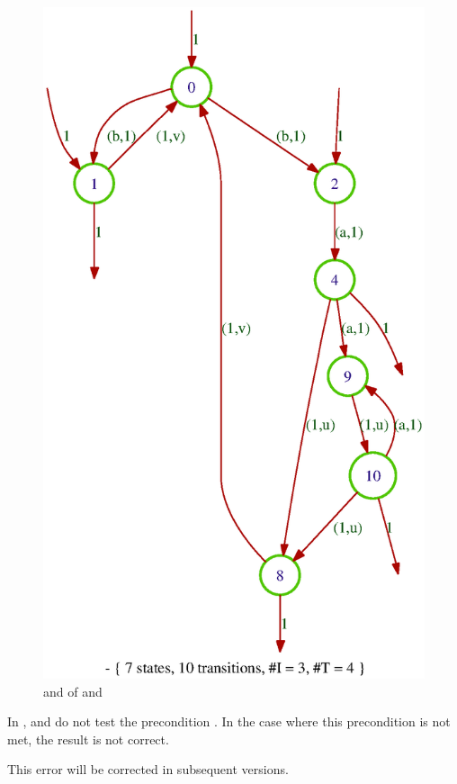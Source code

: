 \begin{figure}[ht]
\includegraphics[scale=0.5]{figures/comp1.ps}
\caption{ and 
 of  and }
\label{fig:com-pos}
\end{figure}


\Cave
In \tafkitv,  and  do not test 
the precondition .
In the case where this precondition is not met, the result is not 
correct.

This error will be corrected in subsequent versions.

